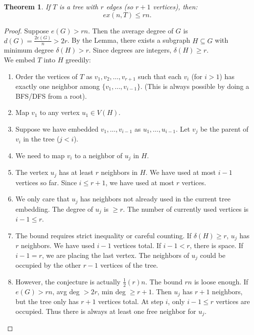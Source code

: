 \documentclass[a4paper]{article}
\newtheorem{thm}{Theorem}[section]
\begin{document}
\begin{thm}
    If $T$ is a tree with $r$ edges (so $r+1$ vertices), then:
    \[
    ex(n,T) \leq rn.
    \]
\end{thm}
\begin{proof}
        Suppose $e(G) > rn$. Then the average degree of $G$ is $d(G) = \frac{2e(G)}{n} > 2r$.
        By the Lemma, there exists a subgraph $H \subseteq G$ with minimum degree $\delta(H) > r$. Since degrees are integers, $\delta(H) \geq r$.\\
        We embed $T$ into $H$ greedily:
        \begin{enumerate}
            \item Order the vertices of $T$ as $v_1, v_2, \dots, v_{r+1}$ such that each $v_i$ (for $i>1$) has exactly one neighbor among $\{v_1, \dots, v_{i-1}\}$. (This is always possible by doing a BFS/DFS from a root).
            \item Map $v_1$ to any vertex $u_1 \in V(H)$.
            \item Suppose we have embedded $v_1, \dots, v_{i-1}$ as $u_1, \dots, u_{i-1}$. Let $v_j$ be the parent of $v_i$ in the tree ($j < i$).
            \item We need to map $v_i$ to a neighbor of $u_j$ in $H$.
            \item The vertex $u_j$ has at least $r$ neighbors in $H$. We have used at most $i-1$ vertices so far. Since $i \leq r+1$, we have used at most $r$ vertices.
            \item We only care that $u_j$ has neighbors not already used in the current tree embedding. The degree of $u_j$ is $\geq r$. The number of currently used vertices is $i-1 \le r$.
            \item The bound requires strict inequality or careful counting. If $\delta(H) \ge r$, $u_j$ has $r$ neighbors. We have used $i-1$ vertices total. If $i-1 < r$, there is space. If $i-1 = r$, we are placing the last vertex. The neighbors of $u_j$ could be occupied by the other $r-1$ vertices of the tree.
            \item However, the conjecture is actually $\frac{1}{2}(r)n$. The bound $rn$ is loose enough. If $e(G) > rn$, avg deg $> 2r$, min deg $\ge r+1$. Then $u_j$ has $r+1$ neighbors, but the tree only has $r+1$ vertices total. At step $i$, only $i-1 \le r$ vertices are occupied. Thus there is always at least one free neighbor for $u_j$.
        \end{enumerate}
\end{proof}
\newpage
\end{document}
